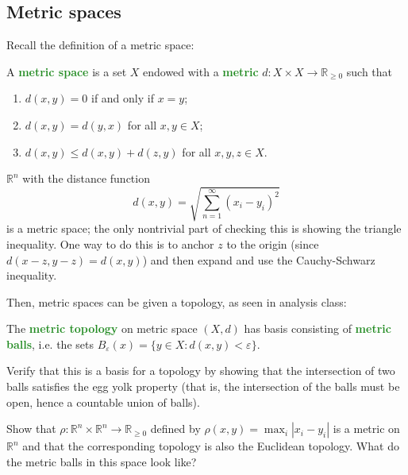 \documentclass[11pt]{scrartcl}
\providecommand{\eps}{\varepsilon}
\providecommand{\RR}{\mathbb R}
\providecommand{\ii}{\item}
\providecommand{\vocab}[1]{{\textbf{\textcolor{ForestGreen}{#1}}}}
\begin{document}
\subsection{Metric spaces}
Recall the definition of a metric space:
\begin{definition}
    \label{def:metric-space}
    A \vocab{metric space} is a set $X$ endowed with a \vocab{metric}
    $d\colon X\times X\to\RR_{\ge0}$ such that
    \begin{enumerate}[(1)]
        \ii $d(x,y) = 0$ if and only if $x=y$;
	\ii $d(x,y) = d(y,x)$ for all $x,y\in X$;
	\ii $d(x,y)\le d(x,y) + d(z,y)$ for all $x,y,z\in X$.
    \end{enumerate}
\end{definition}

\begin{example}
    $\RR^n$ with the distance function
    \begin{equation*}
	d(x,y) = \sqrt{\sum_{n=1}^\infty (x_i-y_i)^2}
    \end{equation*}
    is a metric space; the only nontrivial part of checking this
    is showing the triangle inequality. One way to do this is
    to anchor $z$ to the origin (since $d(x-z,y-z) = d(x,y)$)
    and then expand and use the Cauchy-Schwarz inequality.
\end{example}

Then, metric spaces can be given a topology,
as seen in analysis class:
\begin{definition}
    \label{def:metric topology}
    The \vocab{metric topology} on metric space $(X,d)$
    has basis consisting of \vocab{metric balls}, i.e. the sets
    $B_\eps(x) = \{y\in X : d(x,y) < \eps\}$.
\end{definition}

\begin{exercise}
    Verify that this is a basis for a topology
    by showing that the intersection of two balls
    satisfies the egg yolk property
    (that is, the intersection of the balls must be open,
    hence a countable union of balls).
\end{exercise}

\begin{exercise}
    Show that $\rho\colon\RR^n\times\RR^n\to\RR_{\ge0}$
    defined by $\rho(x,y) = \max_i |x_i-y_i|$ is a metric on $\RR^n$
    and that the corresponding topology is also the Euclidean topology.
    What do the metric balls in this space look like?
\end{exercise}
\end{document}
